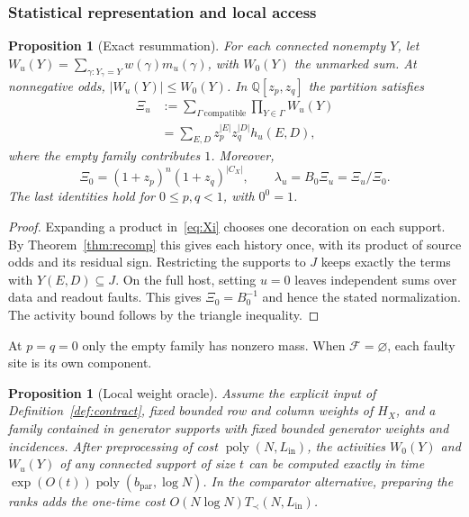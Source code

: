 \documentclass[10pt,twocolumn]{article}
\newtheorem{proposition}[theorem]{Proposition}
\theoremstyle{definition}
\DeclareMathOperator{\poly}{poly}
\newcommand{\Lin}{L_{\mathrm{in}}}
\newcommand{\bpar}{b_{\mathrm{par}}}
\newcommand{\Tprec}{T_{\prec}}
\newcommand{\FF}{\mathcal{F}}
\begin{document}
\subsubsection{Statistical representation and local access}


\begin{proposition}[Exact resummation]\label{prop:resum}
For each connected nonempty $Y$, let
$W_u(Y)=\sum_{\gamma:Y_\gamma=Y}w(\gamma)m_u(\gamma)$,
with $W_0(Y)$ the unmarked sum. At nonnegative odds,
$|W_u(Y)|\le W_0(Y)$. In $\mathbb Q[z_p,z_q]$ the partition satisfies
\begin{equation}\label{eq:Xi}
\begin{aligned}
 \Xi_u&:=\sum_{\Gamma\ \mathrm{compatible}}\prod_{Y\in\Gamma}W_u(Y)\\
      &=\sum_{E,D}z_p^{|E|}z_q^{|D|}h_u(E,D),
\end{aligned}
\end{equation}
where the empty family contributes $1$. Moreover,
\[
 \Xi_0=(1+z_p)^n(1+z_q)^{|C_X|},\qquad
 \lambda_u=B_0\Xi_u=\Xi_u/\Xi_0.
\]
The last identities hold for $0\le p,q<1$, with $0^0=1$.
\end{proposition}

\begin{proof}
Expanding a product in~\eqref{eq:Xi} chooses one decoration on each
support. By Theorem~\ref{thm:recomp} this gives each history once,
with its product of source odds and its residual sign. Restricting the
supports to $J$ keeps exactly the terms with $Y(E,D)\subseteq J$.
On the full host, setting $u=0$ leaves independent sums over data
and readout faults. This gives $\Xi_0=B_0^{-1}$ and hence the
stated normalization. The activity bound follows by the triangle
inequality.
\end{proof}

At $p=q=0$ only the empty family has nonzero mass. When
$\FF=\varnothing$, each faulty site is its own component.

\begin{proposition}[Local weight oracle]\label{prop:oracle}
Assume the explicit input of Definition~\ref{def:contract}, fixed bounded
row and column weights of $H_X$, and a family contained in generator
supports with fixed bounded generator weights and incidences.
After preprocessing of cost $\poly(N,\Lin)$, the activities $W_0(Y)$
and $W_u(Y)$ of any connected support of size $t$ can be computed exactly
in time $\exp(O(t))\poly(\bpar,\log N)$.
In the comparator alternative, preparing the ranks adds the one-time
cost $O(N\log N)\Tprec(N,\Lin)$.
\end{proposition}
\end{document}
